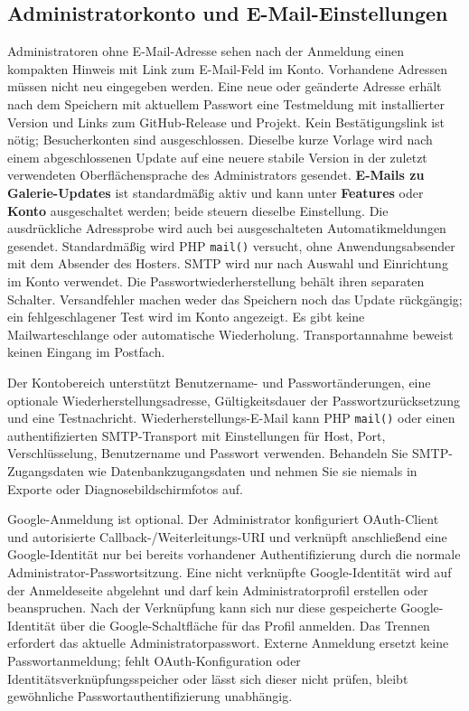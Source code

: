 \documentclass[11pt,a4paper]{article}
\newcommand{\ui}[1]{\textbf{#1}}
\newcommand{\codeword}[1]{\nolinkurl{#1}}
\begin{document}
\subsection{Administratorkonto und E-Mail-Einstellungen}

Administratoren ohne E-Mail-Adresse sehen nach der Anmeldung einen kompakten
Hinweis mit Link zum E-Mail-Feld im Konto. Vorhandene Adressen müssen nicht
neu eingegeben werden. Eine neue oder geänderte Adresse erhält nach dem
Speichern mit aktuellem Passwort eine Testmeldung mit installierter Version
und Links zum GitHub-Release und Projekt. Kein Bestätigungslink ist nötig;
Besucherkonten sind ausgeschlossen. Dieselbe kurze Vorlage wird nach einem
abgeschlossenen Update auf eine neuere stabile Version in der zuletzt
verwendeten Oberflächensprache des Administrators gesendet.
\ui{E-Mails zu Galerie-Updates} ist standardmäßig aktiv und kann unter
\ui{Features} oder \ui{Konto} ausgeschaltet werden; beide steuern dieselbe
Einstellung. Die ausdrückliche Adressprobe wird auch bei ausgeschalteten
Automatikmeldungen gesendet. Standardmäßig wird PHP \codeword{mail()} versucht,
ohne Anwendungsabsender mit dem Absender des Hosters. SMTP wird nur nach Auswahl
und Einrichtung im Konto verwendet. Die Passwortwiederherstellung behält ihren
separaten Schalter. Versandfehler machen weder das Speichern noch das Update
rückgängig; ein fehlgeschlagener Test wird im Konto angezeigt. Es gibt keine
Mailwarteschlange oder automatische Wiederholung. Transportannahme beweist
keinen Eingang im Postfach.

Der Kontobereich unterstützt Benutzername- und Passwortänderungen, eine
optionale Wiederherstellungsadresse, Gültigkeitsdauer der Passwortzurücksetzung
und eine Testnachricht. Wieder\-her\-stel\-lungs-E-Mail kann PHP
\codeword{mail()} oder einen authentifizierten SMTP-Transport mit Einstellungen
für Host, Port, Verschlüsselung, Benutzername und Passwort verwenden. Behandeln
Sie SMTP-Zugangsdaten wie Datenbankzugangsdaten und nehmen Sie sie niemals in
Exporte oder Diagnosebildschirmfotos auf.

Google-Anmeldung ist optional. Der Administrator konfiguriert OAuth-Client und
autorisierte Callback-/Weiterleitungs-URI und verknüpft anschließend eine
Google-Identität nur bei bereits vorhandener Authentifizierung durch die normale
Administrator-Passwortsitzung. Eine nicht verknüpfte Google-Identität wird auf
der Anmeldeseite abgelehnt und darf kein Administratorprofil erstellen oder
beanspruchen. Nach der Verknüpfung kann sich nur diese gespeicherte
Google-Identität über die Google-Schaltfläche für das Profil anmelden. Das
Trennen erfordert das aktuelle Administratorpasswort. Externe Anmeldung ersetzt
keine Passwortanmeldung; fehlt OAuth-Konfiguration oder
Identitätsverknüpfungsspeicher oder lässt sich dieser nicht prüfen, bleibt
gewöhnliche Passwortauthentifizierung unabhängig.
\end{document}
